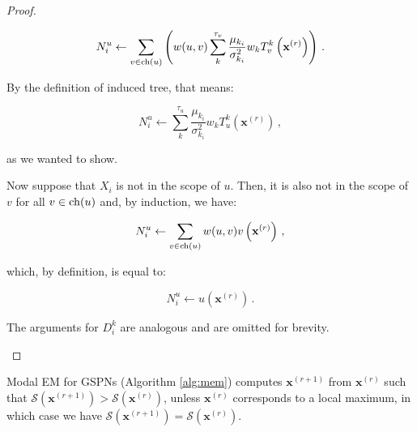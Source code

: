 \begin{proof}
\begin{description}
      \begin{equation}
        N^u_i \gets \sum_{v \in \operatorname*{ch}(u)} \left( w(u, v) \sum_k^{\tau_v} \frac{\mu_{k_i}}{\sigma_{k_i}^2} w_k T_v^k\left(\mathbf{x}^{(r)}\right) \right) \, .
      \end{equation}

      By the definition of induced tree, that means:

      \begin{equation}
        N^u_i \gets \sum_k^{\tau_u} \frac{\mu_{k_i}}{\sigma_{k_i}^2} w_k T_u^k\left(\mathbf{x}^{(r)}\right) \, ,
      \end{equation}

      \noindent as we wanted to show.

      Now suppose that $X_i$ is not in the scope of $u$. Then, it is also not in the scope of $v$ for all $v \in \operatorname*{ch}(u)$ and, by induction, we have:

      \begin{equation}
        N^u_i \gets \sum_{v \in \operatorname*{ch}(u)} w(u, v) v\left(\mathbf{x}^{(r)}\right) \, ,
      \end{equation}

      \noindent which, by definition, is equal to:

      \begin{equation}
        N^u_i \gets u\left(\mathbf{x}^{(r)}\right) \, .
      \end{equation}

      The arguments for $D^k_i$ are analogous and are omitted for brevity.
  \end{description}
\end{proof}

\begin{theorem}
  \label{thm:alg_correctness}
  Modal EM for GSPNs (Algorithm \ref{alg:mem}) computes $\mathbf{x}^{(r+1)}$ from $\mathbf{x}^{(r)}$ such that $\mathcal{S}\left(\mathbf{x}^{(r+1)}\right) > \mathcal{S}\left(\mathbf{x}^{(r)}\right)$, unless $\mathbf{x}^{(r)}$ corresponds to a local maximum, in which case we have $\mathcal{S}\left(\mathbf{x}^{(r+1)}\right) = \mathcal{S}\left(\mathbf{x}^{(r)}\right)$.
\end{theorem}


